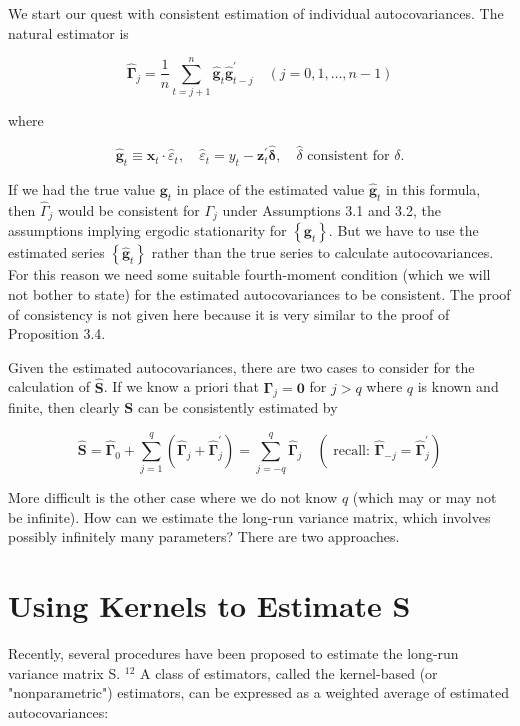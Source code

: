 \documentclass[10pt]{article}
\begin{document}
We start our quest with consistent estimation of individual autocovariances. The natural estimator is


\begin{equation*}
\widehat{\boldsymbol{\Gamma}}_{j}=\frac{1}{n} \sum_{t=j+1}^{n} \hat{\mathbf{g}}_{t} \hat{\mathbf{g}}_{t-j}^{\prime} \quad(j=0,1, \ldots, n-1) \tag{6.6.3}
\end{equation*}


where

$$
\hat{\mathbf{g}}_{t} \equiv \mathbf{x}_{t} \cdot \hat{\varepsilon}_{t}, \quad \hat{\varepsilon}_{t}=y_{t}-\mathbf{z}_{t}^{\prime} \hat{\boldsymbol{\delta}}, \quad \hat{\delta} \text { consistent for } \delta .
$$

If we had the true value $\mathbf{g}_{t}$ in place of the estimated value $\hat{\mathbf{g}}_{t}$ in this formula, then $\widehat{\Gamma}_{j}$ would be consistent for $\Gamma_{j}$ under Assumptions 3.1 and 3.2, the assumptions implying ergodic stationarity for $\left\{\mathbf{g}_{t}\right\}$. But we have to use the estimated series $\left\{\hat{\mathbf{g}}_{t}\right\}$ rather than the true series to calculate autocovariances. For this reason we need some suitable fourth-moment condition (which we will not bother to state) for the estimated autocovariances to be consistent. The proof of consistency is not given here because it is very similar to the proof of Proposition 3.4.

Given the estimated autocovariances, there are two cases to consider for the calculation of $\widehat{\mathbf{S}}$. If we know a priori that $\boldsymbol{\Gamma}_{j}=\mathbf{0}$ for $j>q$ where $q$ is known and finite, then clearly $\mathbf{S}$ can be consistently estimated by


\begin{equation*}
\widehat{\mathbf{S}}=\widehat{\boldsymbol{\Gamma}}_{0}+\sum_{j=1}^{q}\left(\widehat{\boldsymbol{\Gamma}}_{j}+\widehat{\boldsymbol{\Gamma}}_{j}^{\prime}\right)=\sum_{j=-q}^{q} \widehat{\boldsymbol{\Gamma}}_{j} \quad\left(\text { recall: } \widehat{\boldsymbol{\Gamma}}_{-j}=\widehat{\boldsymbol{\Gamma}}_{j}^{\prime}\right) \tag{6.6.4}
\end{equation*}


More difficult is the other case where we do not know $q$ (which may or may not be infinite). How can we estimate the long-run variance matrix, which involves possibly infinitely many parameters? There are two approaches.

\section*{Using Kernels to Estimate S}
Recently, several procedures have been proposed to estimate the long-run variance matrix S. ${ }^{12}$ A class of estimators, called the kernel-based (or "nonparametric") estimators, can be expressed as a weighted average of estimated autocovariances:
\end{document}
